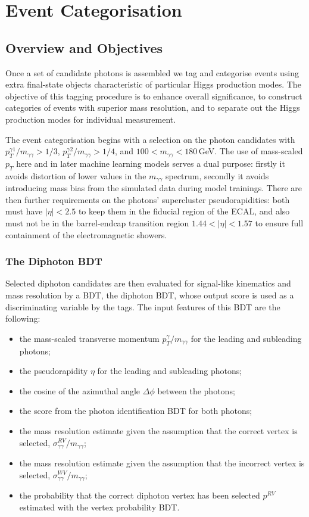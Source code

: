 \chapter{Event Categorisation}
\label{chap:event_select}

\newpage
\section{Overview and Objectives}
Once a set of candidate photons is assembled we tag and categorise events using extra final-state objects characteristic of particular Higgs production modes.
The objective of this tagging procedure is to enhance overall significance, to construct categories of events with superior mass resolution, and to separate out the Higgs production modes for individual measurement. 


The event categorisation begins with a selection on the photon candidates with $p_{T}^{\gamma1}/m_{\gamma\gamma} > 1/3$, $p_{T}^{\gamma2}/m_{\gamma\gamma} > 1/4$, and $100 < m_{\gamma\gamma} < 180$\,GeV.
The use of mass-scaled $p_{T}$ here and in later machine learning models serves a dual purpose: firstly it avoids distortion of lower values in the $m_{\gamma\gamma}$ spectrum, secondly it avoids introducing mass bias from the simulated data during model trainings. 
There are then further requirements on the photons' supercluster pseudorapidities: both must have $|\eta| < 2.5$ to keep them in the fiducial region of the ECAL, and also must not be in the barrel-endcap transition region $1.44 < |\eta| < 1.57$ to ensure full containment of the electromagnetic showers. 


\subsection{The Diphoton BDT}
Selected diphoton candidates are then evaluated for signal-like kinematics and mass resolution by a BDT, the diphoton BDT, whose output score is used as a discriminating variable by the tags.
The input features of this BDT are the following:
\begin{itemize}[noitemsep]
    \item the mass-scaled transverse momentum $p^{\gamma}_{T}/m_{\gamma\gamma}$ for the leading and subleading photons;
    \item the pseudorapidity $\eta$ for the leading and subleading photons;
    \item the cosine of the azimuthal angle $\Delta\phi$ between the photons;
    \item the score from the photon identification BDT for both photons;
    \item the mass resolution estimate given the assumption that the correct vertex is selected, $\sigma^{RV}_{\gamma\gamma}/m_{\gamma\gamma}$;
    \item the mass resolution estimate given the assumption that the incorrect vertex is selected, $\sigma^{WV}_{\gamma\gamma}/m_{\gamma\gamma}$;
    \item the probability that the correct diphoton vertex has been selected $p^{RV}$ estimated with the vertex probability BDT.
\end{itemize}


